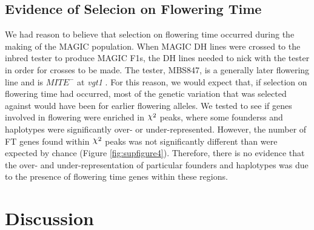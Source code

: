 \documentclass[article,9pt,twocolumn,twoside]{rilabRxiv}
\DeclareRobustCommand{\rchi}{{\mathpalette\irchi\relax}}
\newcommand{\irchi}[2]{\raisebox{\depth}{$#1\chi$}} %
\begin{document}
\subsection{Evidence of Selecion on Flowering Time}
We had reason to believe that selection on flowering time occurred during the making of the MAGIC population.
When MAGIC DH lines were crossed to the inbred tester to produce MAGIC F1s, the DH lines needed to nick with the tester in order for crosses to be made.
The tester, MBS847, is a generally later flowering line and is $MITE^-$ at \emph{vgt1} \cite{Chardon}.
For this reason, we would expect that, if selection on flowering time had occurred, most of the genetic variation that was selected against would have been for earlier flowering alleles.
We tested to see if genes involved in flowering were enriched in $\rchi^2$ peaks, where some founderss and haplotypes were significantly over- or under-represented.
However, the number of FT genes found within $\rchi^2$ peaks was not significantly different than were expected by chance (Figure \ref{fig:supfigure4}).
Therefore, there is no evidence that the over- and under-representation of particular founders and haplotypes was due to the presence of flowering time genes within these regions.



\section{Discussion}
\end{document}
